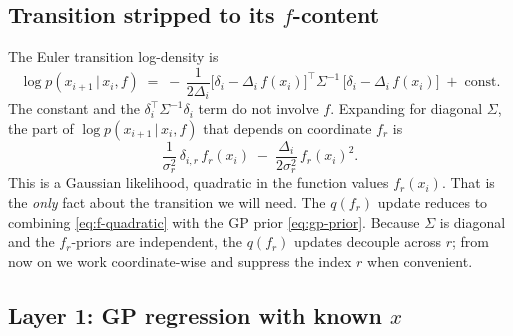 \documentclass[11pt]{article}
\newcommand{\given}{\,|\,}
\begin{document}
\subsection{Transition stripped to its $f$-content}
\label{sec:transition}

The Euler transition log-density is
\begin{equation}
\log p(x_{i+1}\given x_i,f)
\;=\;
-\,\frac{1}{2\Delta_i}
\bigl[\delta_i - \Delta_i\, f(x_i)\bigr]^{\!\top}\!
\Sigma^{-1}\,
\bigl[\delta_i - \Delta_i\, f(x_i)\bigr]
\;+\; \text{const}.
\end{equation}
The constant and the $\delta_i^\top\Sigma^{-1}\delta_i$ term do not involve $f$.
Expanding for diagonal $\Sigma$, the part of $\log p(x_{i+1}\given x_i,f)$
that depends on coordinate $f_r$ is
\begin{equation}
\boxed{\;
\frac{1}{\sigma_r^2}\,\delta_{i,r}\, f_r(x_i)
\;-\;
\frac{\Delta_i}{2\sigma_r^2}\, f_r(x_i)^2.
\;}
\label{eq:f-quadratic}
\end{equation}
This is a Gaussian likelihood, quadratic in the function values $f_r(x_i)$.
That is the \emph{only} fact about the transition we will need. The $q(f_r)$
update reduces to combining \eqref{eq:f-quadratic} with the GP prior
\eqref{eq:gp-prior}. Because $\Sigma$ is diagonal and the $f_r$-priors are
independent, the $q(f_r)$ updates decouple across $r$; from now on we work
coordinate-wise and suppress the index $r$ when convenient.

\subsection{Layer 1: GP regression with known $x$}
\label{sec:known-x}
\end{document}
